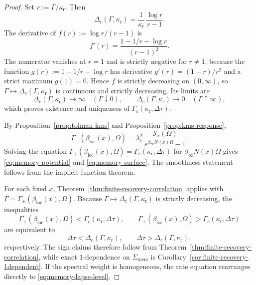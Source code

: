 \begin{proof}
Set $r:=\Gamma/\kappa_{\mathrm r}$. Then
\[
\Delta_c(\Gamma,\kappa_{\mathrm r})
=
\frac{1}{\kappa_{\mathrm r}}\,\frac{\log r}{r-1}.
\]
The derivative of $f(r):=\log r/(r-1)$ is
\[
f'(r)
=
\frac{1-1/r-\log r}{(r-1)^2}.
\]
The numerator vanishes at $r=1$ and is strictly negative for $r\neq 1$, because the function $g(r):=1-1/r-\log r$ has derivative $g'(r)=(1-r)/r^2$ and a strict maximum $g(1)=0$. Hence $f$ is strictly decreasing on $(0,\infty)$, so $\Gamma\mapsto \Delta_c(\Gamma,\kappa_{\mathrm r})$ is continuous and strictly decreasing. Its limits are
\[
\Delta_c(\Gamma,\kappa_{\mathrm r})\to\infty
\quad
(\Gamma\downarrow 0),
\qquad
\Delta_c(\Gamma,\kappa_{\mathrm r})\to 0
\quad
(\Gamma\uparrow\infty),
\]
which proves existence and uniqueness of $\Gamma_c(\kappa_{\mathrm r},\Delta\tau)$.

By Proposition~\ref{prop:tolman-kms} and Proposition~\ref{prop:kms-response},
\[
\Gamma_+(\beta_{\mathrm{loc}}(x),\Omega)
=
\lambda_c^2\,
\frac{\mathcal S_x(\Omega)}{e^{\beta_\infty N(x)\Omega}-1}.
\]
Solving the equation $\Gamma_+(\beta_{\mathrm{loc}}(x),\Omega)=\Gamma_c(\kappa_{\mathrm r},\Delta\tau)$ for $\beta_\infty N(x)\Omega$ gives \eqref{eq:memory-potential} and \eqref{eq:memory-surface}. The smoothness statement follows from the implicit-function theorem.

For each fixed $x$, Theorem~\ref{thm:finite-recovery-correlation} applies with $\Gamma=\Gamma_+(\beta_{\mathrm{loc}}(x),\Omega)$. Because $\Gamma\mapsto\Delta_c(\Gamma,\kappa_{\mathrm r})$ is strictly decreasing, the inequalities
\[
\Gamma_+(\beta_{\mathrm{loc}}(x),\Omega)<\Gamma_c(\kappa_{\mathrm r},\Delta\tau),
\qquad
\Gamma_+(\beta_{\mathrm{loc}}(x),\Omega)>\Gamma_c(\kappa_{\mathrm r},\Delta\tau)
\]
are equivalent to
\[
\Delta\tau<\Delta_c(\Gamma,\kappa_{\mathrm r}),
\qquad
\Delta\tau>\Delta_c(\Gamma,\kappa_{\mathrm r}),
\]
respectively. The sign claims therefore follow from Theorem~\ref{thm:finite-recovery-correlation}, while exact $1$-dependence on $\Sigma_{\mathrm{mem}}$ is Corollary~\ref{cor:finite-recovery-1dependent}. If the spectral weight is homogeneous, the rate equation rearranges directly to \eqref{eq:memory-lapse-level}.
\end{proof}

